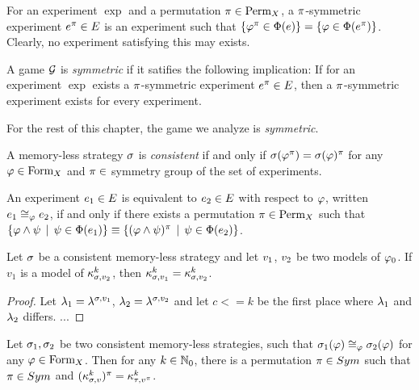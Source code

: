 \begin{definition}
For an experiment $\exp$ and a permutation $\pi\in\textrm{Perm}_X$,
  a $\pi$-symmetric experiment $e^\pi\in E$ is an experiment such that
  $\{\varphi^\pi \in\Phi(e)\} = \{\varphi\in\Phi(e^\pi)\}$.
Clearly, no experiment satisfying this may exists.
\end{definition}

\begin{definition}
A game $\mathcal{G}$ is \emph{symmetric} if it satifies the following implication:
If for an experiment $\exp$ exists a $\pi$-symmetric experiment $e^\pi\in E$,
  then a $\pi$-symmetric experiment exists for every experiment.
\end{definition}

For the rest of this chapter, the game we analyze is \emph{symmetric}.

\begin{definition}
A memory-less strategy $\sigma$ is \emph{consistent} if and only if
  $\sigma(\varphi^\pi) = \sigma(\varphi)^\pi$ for any $\varphi\in\textrm{Form}_X$ and
  $\pi\in$ symmetry group of the set of experiments.
\end{definition}


\newcommand{\expeq}[1]{\cong_{#1}}
\begin{definition}
An experiment $e_1\in E$ is equivalent to $e_2\in E$ with respect to $\varphi$,
  written $\exp_1\expeq{\form}\exp_2$,
  if and only if there exists a permutation $\pi\in\textrm{Perm}_X$ such that
 $ \{ \varphi\wedge\psi \:\:|\:\: \psi\in\Phi(e_1) \} \equiv
   \{ (\varphi\wedge\psi)^\pi \:\:|\:\: \psi\in\Phi(e_2) \} $.
\end{definition}

\begin{lemma} \label{lma-accruedknowledge}
Let $\sigma$ be a consistent memory-less strategy and let $v_1$, $v_2$ be two models of $\varphi_0$.
If $v_1$ is a model of $\kappa_{\sigma, v_2}^{k}$, then $\kappa_{\sigma, v_1}^{k} = \kappa_{\sigma, v_2}^{k}$.
\end{lemma}
\begin{proof}
Let $\lambda_1 = \lambda^{\sigma,v_1}$, $\lambda_2 = \lambda^{\sigma,v_2}$
and let $c <= k$ be the first place where $\lambda_1$ and $\lambda_2$ differs.
...
\end{proof}

\begin{theorem}
Let $\sigma_1, \sigma_2$ be two consistent memory-less strategies, such that
$\stg_1(\form) \expeq{\form} \stg_2(\form)$ for any $\varphi\in\textrm{Form}_X$.
Then for any $k\in\mathbb{N}_0$, there is a permutation $\pi\in Sym$ such that
$\pi\in Sym$ and $(\kappa_{\sigma, v}^{k})^\pi = \kappa_{\tau, v^\pi}^{k}$.
\end{theorem}

